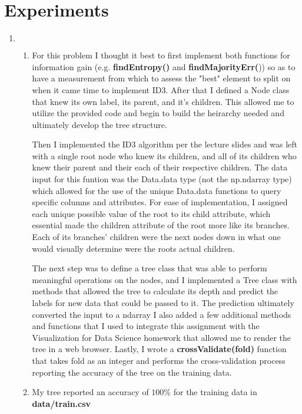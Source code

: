 \documentclass[11pt,a4paper,draft]{article}
\begin{document}
	\section{Experiments}
		\begin{enumerate}
			\item $ $
			\begin{enumerate}
				\item For this problem I thought it best to first implement both functions for information gain (e.g.\textbf{ findEntropy()} and \textbf{findMajorityErr(})) so as to have a measurement from which to assess the "best" element to split on when it came time to implement ID3. After that I defined a Node class that knew its own label, its parent, and it's children. This allowed me to utilize the provided code and begin to build the heirarchy needed and ultimately develop the tree structure.
				
				Then I implemented the ID3 algorithm per the lecture slides and was left with a single root node who knew its children, and all of its children who knew their parent and their each of their respective children. The data input for this funtion was the Data.data type (not the np.ndarray type) which allowed for the use of the unique Data.data functions to query specific columns and attributes. For ease of implementation, I assigned each unique possible value of the root to its child attribute, which essential made the children attribute of the root more like its branches. Each of its branches' children were the next nodes down in what one would visually determine were the roots actual children.
				
				 The next step was to define a tree class that was able to perform meaningful operations on the nodes, and I implemented a Tree class with methods that allowed the tree to calculate its depth and predict the labels for new data that could be passed to it. The prediction ultimately converted the input to a ndarray I also added a few additional methods and functions that I used to integrate this assignment with the Visualization for Data Science homework that allowed me to render the tree in a web browser. Lastly, I wrote a \textbf{crossValidate(fold)} function that takes fold as an integer and performs the cross-validation process reporting the accuracy of the tree on the training data.
				 
				 \item My tree reported an accuracy of $100\%$ for the training data in \textbf{data/train.csv}
				 

\end{enumerate}
\end{enumerate}
\end{document}

